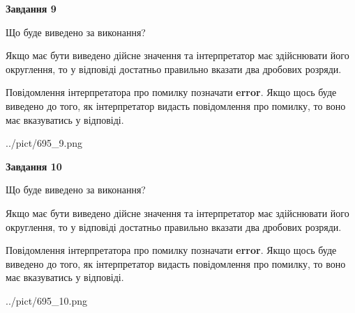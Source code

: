 \documentclass[12pt, ukrainian]{article}
\begin{document}
{\begin {Large}
{\begin {center}\textbf{Завдання 9}\end {center}}\par
Що буде виведено за виконання? \par

Якщо має бути виведено дійсне значення та інтерпретатор має здійснювати його округлення, 
то у відповіді достатньо правильно вказати два дробових розряди.

Повідомлення інтерпретатора про помилку позначати \textbf{error}.
Якщо щось буде виведено до того, як інтерпретатор видасть повідомлення про помилку, 
то воно має вказуватись у відповіді. \par

\begin{center}
	{../pict/695_9.png}
\end{center}
\newpage

{\begin {center}\textbf{Завдання 10}\end {center}}\par
Що буде виведено за виконання? \par

Якщо має бути виведено дійсне значення та інтерпретатор має здійснювати його округлення, 
то у відповіді достатньо правильно вказати два дробових розряди.

Повідомлення інтерпретатора про помилку позначати \textbf{error}.
Якщо щось буде виведено до того, як інтерпретатор видасть повідомлення про помилку, 
то воно має вказуватись у відповіді. \par

\begin{center}
	{../pict/695_10.png}
\end{center}
\newpage

\end {Large}}
\end{document}

